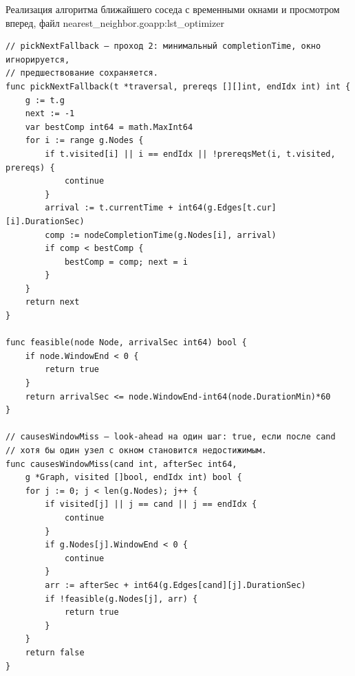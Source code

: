 \begin{codelisting}{Реализация алгоритма ближайшего соседа с временными окнами и просмотром вперед, файл nearest\_neighbor.go}{app:lst_optimizer}
\begin{verbatim}
// pickNextFallback — проход 2: минимальный completionTime, окно игнорируется,
// предшествование сохраняется.
func pickNextFallback(t *traversal, prereqs [][]int, endIdx int) int {
    g := t.g
    next := -1
    var bestComp int64 = math.MaxInt64
    for i := range g.Nodes {
        if t.visited[i] || i == endIdx || !prereqsMet(i, t.visited, prereqs) {
            continue
        }
        arrival := t.currentTime + int64(g.Edges[t.cur][i].DurationSec)
        comp := nodeCompletionTime(g.Nodes[i], arrival)
        if comp < bestComp {
            bestComp = comp; next = i
        }
    }
    return next
}

func feasible(node Node, arrivalSec int64) bool {
    if node.WindowEnd < 0 {
        return true
    }
    return arrivalSec <= node.WindowEnd-int64(node.DurationMin)*60
}

// causesWindowMiss — look-ahead на один шаг: true, если после cand
// хотя бы один узел с окном становится недостижимым.
func causesWindowMiss(cand int, afterSec int64,
    g *Graph, visited []bool, endIdx int) bool {
    for j := 0; j < len(g.Nodes); j++ {
        if visited[j] || j == cand || j == endIdx {
            continue
        }
        if g.Nodes[j].WindowEnd < 0 {
            continue
        }
        arr := afterSec + int64(g.Edges[cand][j].DurationSec)
        if !feasible(g.Nodes[j], arr) {
            return true
        }
    }
    return false
}
  \end{verbatim}
\end{codelisting}


